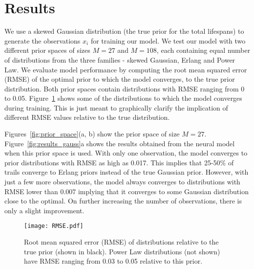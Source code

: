 \documentclass[10pt,letterpaper]{article}
\begin{document}
\section{Results}

We use a skewed Gaussian distribution (the true prior for the total lifespans) to generate the observations $x_i$ for training our model. We test our model with two different prior spaces of sizes $M=27$ and $M=108$, each containing equal number of distributions from the three families - skewed Gaussian, Erlang and Power Law. We evaluate model performance by computing the root mean squared error (RMSE) of the optimal prior to which the model converges, to the true prior distribution. Both prior spaces contain distributions with RMSE ranging from 0 to 0.05. Figure~\ref{fig:rmse} shows some of the distributions to which the model converges during training. This is just meant to graphically clarify the implication of different RMSE values relative to the true distribution. 

Figures~\ref{fig:prior_space}(a, b) show the prior space of size $M=27$. Figure~\ref{fig:results_gauss}a shows the results obtained from the neural model when this prior space is used. With only one observation, the model converges to prior distributions with RMSE as high as 0.017. This implies that 25-50\% of trails converge to Erlang priors instead of the true Gaussian prior. However, with just a few more observations, the model always converges to distributions with RMSE lower than 0.007 implying that it converges to some Gaussian distribution close to the optimal. On further increasing the number of observations, there is only a slight improvement.  

\begin{figure}[ht]
\setlength{\belowcaptionskip}{-10pt}
\setlength{\abovecaptionskip}{-5pt}
\begin{center}
\texttt{[image: RMSE.pdf]}
\end{center}
\caption{Root mean squared error (RMSE) of distributions relative to the true prior (shown in black). Power Law distributions (not shown) have RMSE ranging from 0.03 to 0.05 relative to this prior.} 
\label{fig:rmse}
\end{figure}
\end{document}
